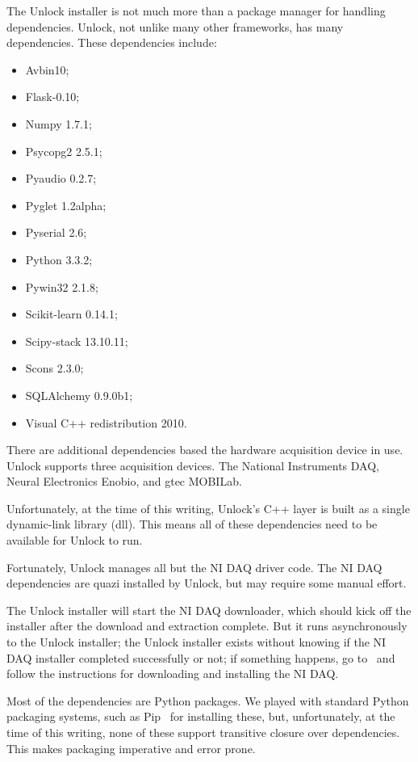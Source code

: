 \documentclass[11pt]{article}
\begin{document}
The Unlock installer is not much more than a package manager for handling dependencies.  Unlock, not unlike many other frameworks, has many dependencies.  These dependencies include:
\begin{itemize}
\item Avbin10;
\item Flask-0.10;
\item Numpy 1.7.1;
\item Psycopg2 2.5.1;
\item Pyaudio 0.2.7;
\item Pyglet 1.2alpha;
\item Pyserial 2.6;
\item Python 3.3.2;
\item Pywin32 2.1.8;
\item Scikit-learn 0.14.1;
\item Scipy-stack 13.10.11;
\item Scons 2.3.0;
\item SQLAlchemy 0.9.0b1;
\item Visual C++ redistribution 2010.
\end{itemize}

There are additional dependencies based the hardware acquisition device in use.  Unlock supports three acquisition devices.  The National Instruments DAQ, Neural Electronics Enobio, and gtec MOBILab.  

Unfortunately, at the time of this writing, Unlock's C++ layer is built as a single dynamic-link library (dll).  This means all of these dependencies need to be available for Unlock to run.  

Fortunately, Unlock manages all but the NI DAQ driver code.  The NI DAQ dependencies are quazi installed by Unlock, but may require some manual effort.  

The Unlock installer will start the NI DAQ downloader, which should kick off the installer after the download and extraction complete.  But it runs asynchronously to the Unlock installer; the Unlock installer exists without knowing if the NI DAQ installer completed successfully or not; if something happens, go to~\cite{nidaq} and follow the instructions for downloading and installing the NI DAQ.

Most of the dependencies are Python packages.  We played with standard Python packaging systems, such as Pip~\cite{pip} for installing these, but, unfortunately, at the time of this writing, none of these support transitive closure over dependencies.  This makes packaging imperative and error prone.  
\end{document}
